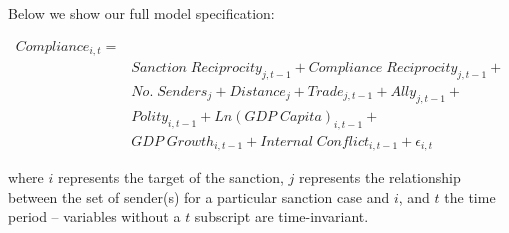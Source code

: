 Below we show our full model specification: 

\begin{align*}
		Compliance_{i,t} =& \\
		&Sanction \; Reciprocity_{j,t-1} + Compliance \; Reciprocity_{j,t-1} + \\
		&No. \; Senders_{j} + Distance_{j} + Trade_{j,t-1} + Ally_{j,t-1} + \\
		&Polity_{i,t-1} + Ln(GDP \; Capita)_{i,t-1} +\\
		&GDP \; Growth_{i,t-1} + Internal \; Conflict_{i,t-1} + \epsilon_{i,t}
\end{align*}

where $i$ represents the target of the sanction, $j$ represents the relationship between the set of sender(s) for a particular sanction case and $i$, and $t$ the time period -- variables without a $t$ subscript are time-invariant.
